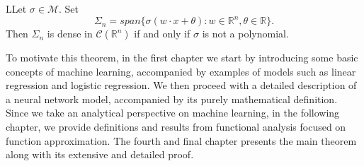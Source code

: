 \documentclass[../main.tex]{subfiles}
\begin{document}
\begin{theo}
	   LLet $ \sigma \in  \mathcal{M}$. Set
	$$ \Sigma_n = span\{\sigma(w\cdot x + \theta) : w\in \mathbb{R}^n, \theta \in \mathbb{R} \}.$$
	Then $\Sigma_n$ is dense in $\mathcal{C}(\mathbb{R}^n)$ if and only if $\sigma$ is not a polynomial. \\ 
\end{theo}
\vspace{\baselineskip} 

\noindent To motivate this theorem, in the first chapter we start by introducing some basic concepts of machine learning, accompanied by examples of models such as linear regression and logistic regression. We then proceed with a detailed description of a neural network model, accompanied by its purely mathematical definition.  Since we take an analytical perspective on machine learning, in the following chapter, we provide definitions and results from functional analysis focused on function approximation. The fourth and final chapter presents the main theorem along with its extensive and detailed proof. 
\end{document}

